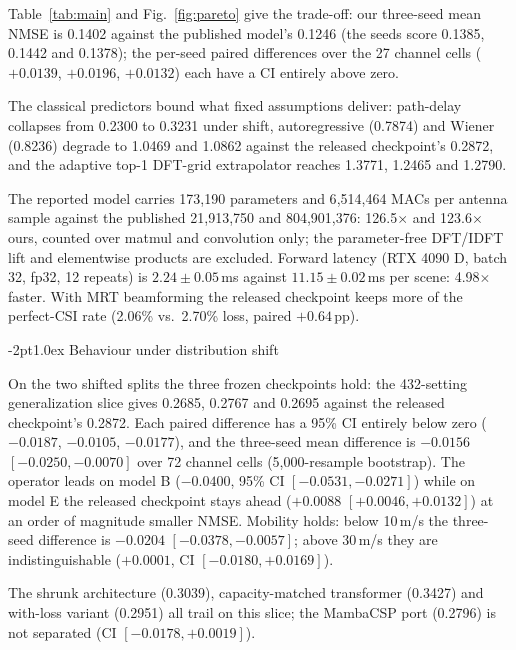 \documentclass{article}
\makeatletter
\renewcommand\subsection{\@startsection{subsection}{2}{\z@}%
  {-2pt}{1.0ex}%
  {\normalfont\large\bfseries}}
\makeatother
\begin{document}
Table~\ref{tab:main} and Fig.~\ref{fig:pareto} give the trade-off: our
three-seed mean NMSE is 0.1402 against the published model's 0.1246 (the
seeds score 0.1385, 0.1442 and 0.1378); the per-seed paired differences
over the 27 channel cells ($+0.0139$, $+0.0196$, $+0.0132$) each have a
CI entirely above zero.

The classical predictors bound what fixed assumptions deliver: path-delay
collapses from 0.2300 to 0.3231 under shift, autoregressive (0.7874) and
Wiener (0.8236) degrade to 1.0469 and 1.0862 against the released
checkpoint's 0.2872, and the adaptive top-1 DFT-grid extrapolator reaches
1.3771, 1.2465 and 1.2790.

The reported model carries 173{,}190 parameters and 6{,}514{,}464 MACs per
antenna sample against the published 21{,}913,750 and 804{,}901,376:
126.5$\times$ and 123.6$\times$ ours, counted over matmul and convolution
only; the parameter-free DFT/IDFT lift and elementwise products are
excluded. Forward latency (RTX 4090 D, batch 32, fp32, 12 repeats) is
$2.24\pm0.05$\,ms against $11.15\pm0.02$\,ms per scene: 4.98$\times$
faster. With MRT beamforming the released checkpoint keeps more of the
perfect-CSI rate (2.06\% vs.\ 2.70\% loss, paired $+0.64$\,pp).

\subsection{Behaviour under distribution shift}
\label{ssec:shift}

On the two shifted splits the three frozen checkpoints hold: the
432-setting generalization slice gives 0.2685, 0.2767 and 0.2695 against
the released checkpoint's 0.2872. Each paired difference has a 95\% CI
entirely below zero ($-0.0187$, $-0.0105$, $-0.0177$), and the three-seed
mean difference is $-0.0156$ $[-0.0250,-0.0070]$ over 72 channel cells
(5{,}000-resample bootstrap). The operator leads on model B
($-0.0400$, 95\% CI $[-0.0531,-0.0271]$) while on model E the released
checkpoint stays ahead ($+0.0088$ $[+0.0046,+0.0132]$) at an order of
magnitude smaller NMSE. Mobility holds: below 10\,m/s the three-seed
difference is $-0.0204$ $[-0.0378,-0.0057]$; above 30\,m/s they are
indistinguishable ($+0.0001$, CI $[-0.0180,+0.0169]$).

The shrunk architecture (0.3039), capacity-matched transformer (0.3427)
and with-loss variant (0.2951) all trail on this slice; the MambaCSP
port (0.2796) is not separated (CI $[-0.0178,+0.0019]$).
\end{document}
